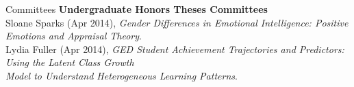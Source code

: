 \documentclass {resume}
\begin{document}
\begin{rSection}{\textrm{Committees}}
{\large \textbf{Undergraduate Honors Theses Committees}}\\
Sloane Sparks (Apr 2014), \textit{Gender Differences in Emotional Intelligence: Positive Emotions and Appraisal Theory}.%
\smallskip\\%
Lydia Fuller (Apr 2014), \textit{GED Student Achievement Trajectories and Predictors: Using the Latent Class Growth\\
\hspace* {6 mm}Model to Understand Heterogeneous Learning Patterns}.%
\end{rSection}%
\end{document}
